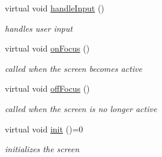 \begin{DoxyCompactItemize}
\mbox{\label{classnta_1_1Screen_a645ccabe314f6c9084b493617c3eeafe}} 
virtual void \hyperlink{classnta_1_1Screen_a645ccabe314f6c9084b493617c3eeafe}{handle\+Input} ()
\begin{DoxyCompactList}\small\item\em handles user input \end{DoxyCompactList}\item 
\mbox{\label{classnta_1_1Screen_af29956d6f8ac437ef2f26c9d0973e509}} 
virtual void \hyperlink{classnta_1_1Screen_af29956d6f8ac437ef2f26c9d0973e509}{on\+Focus} ()
\begin{DoxyCompactList}\small\item\em called when the screen becomes active \end{DoxyCompactList}\item 
\mbox{\label{classnta_1_1Screen_a172d24c2224aef718d151b621379def1}} 
virtual void \hyperlink{classnta_1_1Screen_a172d24c2224aef718d151b621379def1}{off\+Focus} ()
\begin{DoxyCompactList}\small\item\em called when the screen is no longer active \end{DoxyCompactList}\item 
\mbox{\label{classnta_1_1Screen_ae749bdd554cea6beb81ed8bcd1cd4ed1}} 
virtual void \hyperlink{classnta_1_1Screen_ae749bdd554cea6beb81ed8bcd1cd4ed1}{init} ()=0
\begin{DoxyCompactList}\small\item\em initializes the screen \end{DoxyCompactList}\end{DoxyCompactItemize}
